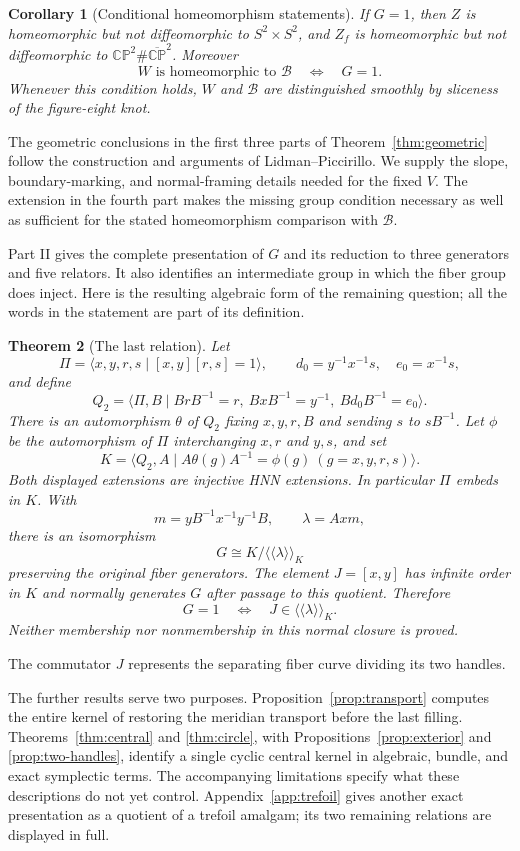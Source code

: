 \documentclass[11pt]{amsart}
\newtheorem{theorem}{Theorem}[section]
\newtheorem{corollary}[theorem]{Corollary}
\theoremstyle{definition}
\theoremstyle{remark}
\newcommand{\CP}{\mathbb{CP}}
\newcommand{\bCP}{\overline{\mathbb{CP}}}
\newcommand{\nc}[1]{\langle\!\langle #1\rangle\!\rangle}
\newcommand{\BK}{\mathcal B}
\begin{document}
\begin{corollary}[Conditional homeomorphism statements]\label{cor:conditional}
If $G=1$, then $Z$ is homeomorphic but not diffeomorphic to
$S^2\times S^2$, and $Z_f$ is homeomorphic but not diffeomorphic to
$\CP^2\#\bCP^2$. Moreover
\[
        W\text{ is homeomorphic to }\BK
          \quad\Longleftrightarrow\quad G=1.
\]
Whenever this condition holds, $W$ and $\BK$ are distinguished smoothly
by sliceness of the figure-eight knot.
\end{corollary}

The geometric conclusions in the first three parts of
Theorem~\ref{thm:geometric} follow the construction and arguments of
Lidman--Piccirillo. We supply the slope, boundary-marking, and normal-framing
details needed for the fixed $V$. The extension in the fourth part makes
the missing group condition necessary as well as sufficient for the
stated homeomorphism comparison with $\BK$.

Part II gives the complete presentation of $G$ and its reduction to three
generators and five relators. It also identifies an intermediate group
in which the fiber group does inject. Here is the resulting algebraic
form of the remaining question; all the words in the statement are part
of its definition.

\begin{theorem}[The last relation]\label{thm:last}
Let
\[
 \Pi=\langle x,y,r,s\mid[x,y][r,s]=1\rangle,\qquad
 d_0=y^{-1}x^{-1}s,\quad e_0=x^{-1}s,
\]
and define
\[
 Q_2=\langle\Pi,B\mid
 BrB^{-1}=r,\ BxB^{-1}=y^{-1},\ Bd_0B^{-1}=e_0\rangle.
\]
There is an automorphism $\theta$ of $Q_2$ fixing $x,y,r,B$ and
sending $s$ to $sB^{-1}$. Let $\phi$ be the automorphism of $\Pi$
interchanging $x,r$ and $y,s$, and set
\[
 K=\langle Q_2,A\mid A\theta(g)A^{-1}=\phi(g)
                      \ (g=x,y,r,s)\rangle.
\]
Both displayed extensions are injective HNN extensions. In particular
$\Pi$ embeds in $K$. With
\[
 m=yB^{-1}x^{-1}y^{-1}B,\qquad \lambda=Axm,
\]
there is an isomorphism
\[
                        G\cong K/\nc{\lambda}_K
\]
preserving the original fiber generators. The element $J=[x,y]$ has
infinite order in $K$ and normally generates $G$ after passage to this
quotient. Therefore
\[
       G=1\quad\Longleftrightarrow\quad J\in\nc{\lambda}_K.
\]
Neither membership nor nonmembership in this normal closure is proved.
\end{theorem}
The commutator $J$ represents the separating fiber curve dividing its
two handles.

The further results serve two purposes. Proposition~\ref{prop:transport}
computes the entire kernel of restoring the meridian transport before
the last filling. Theorems~\ref{thm:central} and \ref{thm:circle}, with
Propositions~\ref{prop:exterior} and \ref{prop:two-handles}, identify a
single cyclic central kernel in algebraic, bundle, and exact symplectic
terms. The accompanying limitations specify what these descriptions do
not yet control. Appendix~\ref{app:trefoil} gives another exact
presentation as a quotient of a trefoil amalgam; its two remaining
relations are displayed in full.
\end{document}
